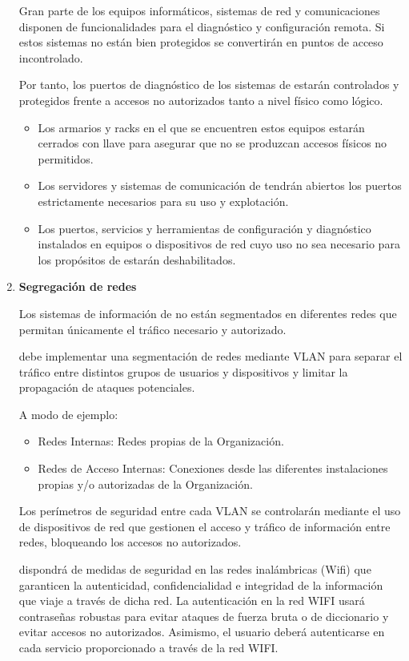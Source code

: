 \begin{enumerate}[label=\alph*)]
    Gran parte de los equipos informáticos, sistemas de red y comunicaciones disponen de funcionalidades para el diagnóstico y configuración remota. Si estos sistemas no están bien protegidos se convertirán en puntos de acceso incontrolado.

    Por tanto, los puertos de diagnóstico de los sistemas de \Beneficiario{} estarán controlados y protegidos frente a accesos no autorizados tanto a nivel físico como lógico.

    \begin{itemize}
        \item Los armarios y racks en el que se encuentren estos equipos estarán cerrados con llave para asegurar que no se produzcan accesos físicos no permitidos.
        \item Los servidores y sistemas de comunicación de \Beneficiario{} tendrán abiertos los puertos estrictamente necesarios para su uso y explotación.
        \item Los puertos, servicios y herramientas de configuración y diagnóstico instalados en equipos o dispositivos de red cuyo uso no sea necesario para los propósitos de \Beneficiario{} estarán deshabilitados.
    \end{itemize}

    \item \textbf{Segregación de redes}

    Los sistemas de información de \Beneficiario{} no están segmentados en diferentes redes que permitan únicamente el tráfico necesario y autorizado.

    \Beneficiario{} debe implementar una segmentación de redes mediante VLAN para separar el tráfico entre distintos grupos de usuarios y dispositivos y limitar la propagación de ataques potenciales.

    A modo de ejemplo:
    \begin{itemize}
        \item Redes Internas: Redes propias de la Organización.
        \item Redes de Acceso Internas: Conexiones desde las diferentes instalaciones propias y/o autorizadas de la Organización.
    \end{itemize}

    Los perímetros de seguridad entre cada VLAN se controlarán mediante el uso de dispositivos de red que gestionen el acceso y tráfico de información entre redes, bloqueando los accesos no autorizados.

    \Beneficiario{} dispondrá de medidas de seguridad en las redes inalámbricas (Wifi) que garanticen la autenticidad, confidencialidad e integridad de la información que viaje a través de dicha red. La autenticación en la red WIFI usará contraseñas robustas para evitar ataques de fuerza bruta o de diccionario y evitar accesos no autorizados. Asimismo, el usuario deberá autenticarse en cada servicio proporcionado a través de la red WIFI.


\end{enumerate}
